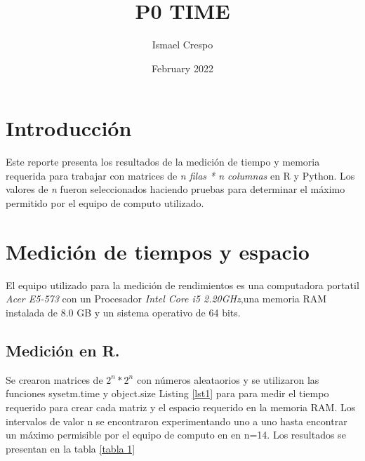 \documentclass{article}
\title{P0 TIME}
\author{Ismael Crespo}
\date{February 2022}
\begin{document}
\maketitle

\section{Introducción}
Este reporte presenta los resultados de la medición de tiempo y memoria requerida para trabajar con matrices de \emph{n filas * n columnas} en R y Python. Los valores de \emph{n} fueron seleccionados haciendo pruebas para determinar el máximo permitido por el equipo de computo utilizado. 

\section{Medición de tiempos y espacio }
El equipo utilizado para la medición de rendimientos es una computadora portatil \emph{Acer E5-573 } con un Procesador \emph{Intel Core i5 2.20GHz},una memoria RAM instalada de 8.0 GB y un sistema operativo de 64 bits.
\subsection{Medición en R.} 
Se crearon matrices de $2^n * 2^n$ con números aleataorios y se utilizaron las funciones sysetm.time y object.size Listing \ref{lst1} para para medir el tiempo requerido para crear cada matriz y el espacio requerido en la memoria RAM. Los intervalos de valor n se encontraron experimentando uno a uno hasta encontrar un máximo permisible por el equipo de computo en en n=14. Los resultados se presentan en la tabla \ref{tabla 1}
\end{document}
